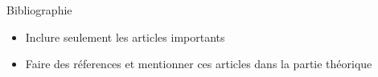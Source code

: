 \documentclass[11pt,ignorenonframetext,]{beamer}
\providecommand{\tightlist}{%
  \setlength{\itemsep}{0pt}\setlength{\parskip}{0pt}}
\begin{document}
\begin{frame}{Bibliographie}
\protect\hypertarget{bibliographie}{}

\begin{itemize}
\tightlist
\item
  Inclure seulement les articles importants
\item
  Faire des réferences et mentionner ces articles dans la partie
  théorique
\end{itemize}

\end{frame}
\end{document}
